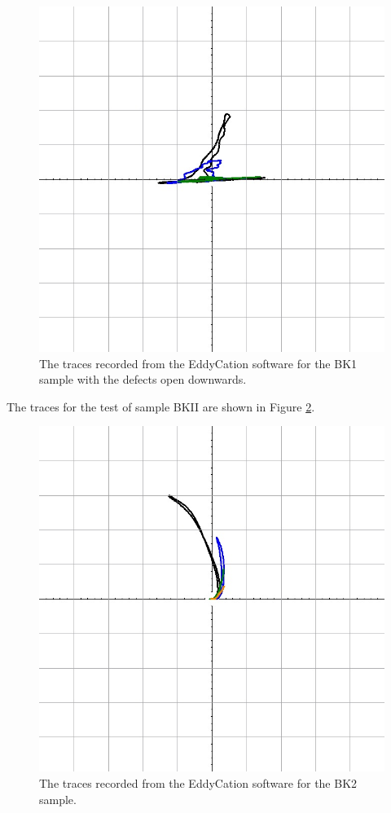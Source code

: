 \documentclass[12 pt]{report}
\begin{document}
\begin{figure}[htbp]
	\centering
	\includegraphics[width=6in]{images/graphs/eddy current testing/S4G2BK1-Downward}
	\caption{The traces recorded from the EddyCation software for the BK1 sample with the defects open downwards.}
	\label{fig:ec_bk1_down}
\end{figure}

The traces for the test of sample BKII are shown in Figure \ref{fig:ec_bk2}.

\begin{figure}[htbp]
	\centering
	\includegraphics[width=6in]{images/graphs/eddy current testing/S4G2BK2}
	\caption{The traces recorded from the EddyCation software for the BK2 sample.}
	\label{fig:ec_bk2}
\end{figure}
\end{document}

